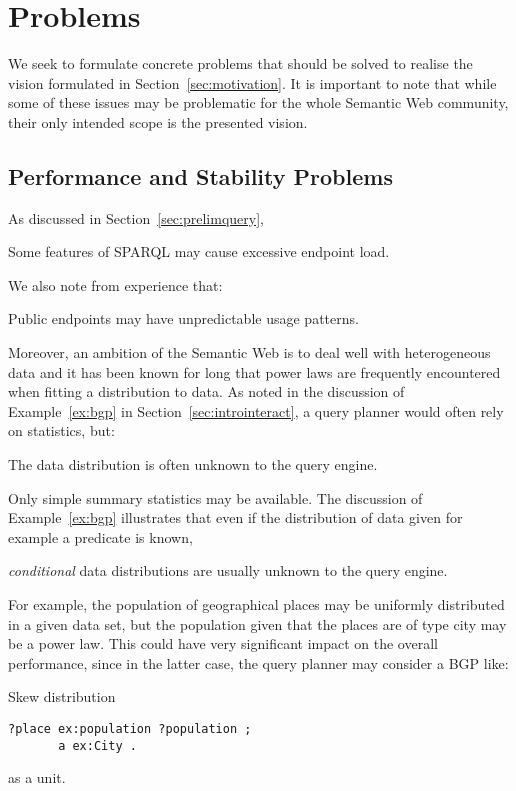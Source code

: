 \section{Problems}\label{sec:problems}

We seek to formulate concrete problems that should be solved to
realise the vision formulated in Section~\ref{sec:motivation}. It is
important to note that while some of these issues may be problematic
for the whole Semantic Web community, their only intended scope is the
presented vision.

\subsection{Performance and Stability Problems}\label{sec:perfproblems}

As discussed in Section~\ref{sec:prelimquery}, 

\begin{problem}\label{prob:sparqlcomplex}
Some features of SPARQL may cause excessive endpoint load.
\end{problem}

We also note from experience that:

\begin{problem}\label{prob:endpointunpred}
Public endpoints may have unpredictable usage patterns.
\end{problem}

Moreover, an ambition of the Semantic Web is to deal well with
heterogeneous data and it has been known for long \cite{1385469} that
power laws are frequently encountered when fitting a distribution to
data. As noted in the discussion of Example~\ref{ex:bgp} in
Section~\ref{sec:introinteract}, a query planner would often rely on
statistics, but:

\begin{problem}\label{prob:unknowndist}
The data distribution is often unknown to the query engine.
\end{problem}
Only simple summary statistics may be available. The discussion of
Example~\ref{ex:bgp} illustrates that even if the distribution of data
given for example a predicate is known, 
\begin{problem}\label{prob:unknownconddist}
\emph{conditional} data distributions are usually unknown to the query engine.
\end{problem}
For example, the population of geographical places may be uniformly
distributed in a given data set, but the population given that the
places are of type city may be a power law. This could have very
significant impact on the overall performance, since in the latter
case, the query planner may consider a BGP like:
\begin{example}{Skew distribution}
\begin{verbatim}
?place ex:population ?population ;
       a ex:City .
\end{verbatim}
\end{example}
as a unit.

